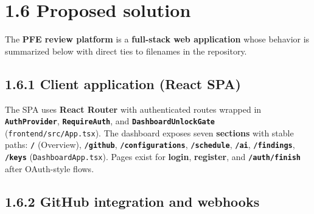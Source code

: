 \documentclass[11pt,a4paper]{report}
\begin{document}
\section{1.6 Proposed solution}


The \textbf{PFE review platform} is a \textbf{full-stack web application} whose behavior is summarized below with direct ties to filenames in the repository.


\subsection{1.6.1 Client application (React SPA)}


The SPA uses \textbf{React Router} with authenticated routes wrapped in \textbf{\texttt{AuthProvider}}, \textbf{\texttt{RequireAuth}}, and \textbf{\texttt{DashboardUnlockGate}} (\texttt{frontend/src/App.tsx}). The dashboard exposes seven \textbf{sections} with stable paths: \textbf{\texttt{/}} (Overview), \textbf{\texttt{/github}}, \textbf{\texttt{/configurations}}, \textbf{\texttt{/schedule}}, \textbf{\texttt{/ai}}, \textbf{\texttt{/findings}}, \textbf{\texttt{/keys}} (\texttt{DashboardApp.tsx}). Pages exist for \textbf{login}, \textbf{register}, and \textbf{\texttt{/auth/finish}} after OAuth-style flows.


\subsection{1.6.2 GitHub integration and webhooks}
\end{document}
